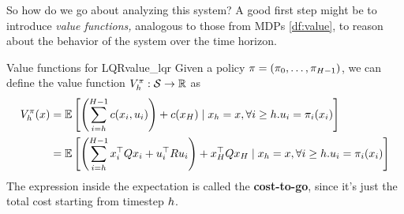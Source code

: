 \documentclass[\main/main]{subfiles}
\begin{document}
So how do we go about analyzing this system? A good first step might be to introduce \emph{value functions,} analogous to those from MDPs \eqref{df:value}, to reason about the behavior of the system over the time horizon.

\begin{definition}{Value functions for LQR}{value_lqr}
    Given a policy $\mathbf{\pi} = (\pi_0, \dots, \pi_{H-1})$, we can define the
    value function $V^\pi_h : \mathcal{S} \to \mathbb{R}$ as
    \[
        \begin{split}
            V^\pi_h (x) &= \operatorname*{\mathbb{E}} \left[ \left( \sum_{i=h}^{H-1} c(x_i, u_i) \right) + c(x_H) \mid x_h = x,  \forall i \ge h. u_i = \pi_i(x_i) \right] \\
            &= \operatorname*{\mathbb{E}} \left[ \left( \sum_{i=h}^{H-1} x_i^\top Q x_i + u_i^\top R u_i \right) + x_H^\top Q x_H \mid x_h = x, \forall i \ge h. u_i = \pi_i(x_i) \right] \\
        \end{split}
    \]
    The expression inside the expectation is called the \textbf{cost-to-go},
    since it's just the total cost starting from timestep $h$.


\end{definition}
\end{document}
